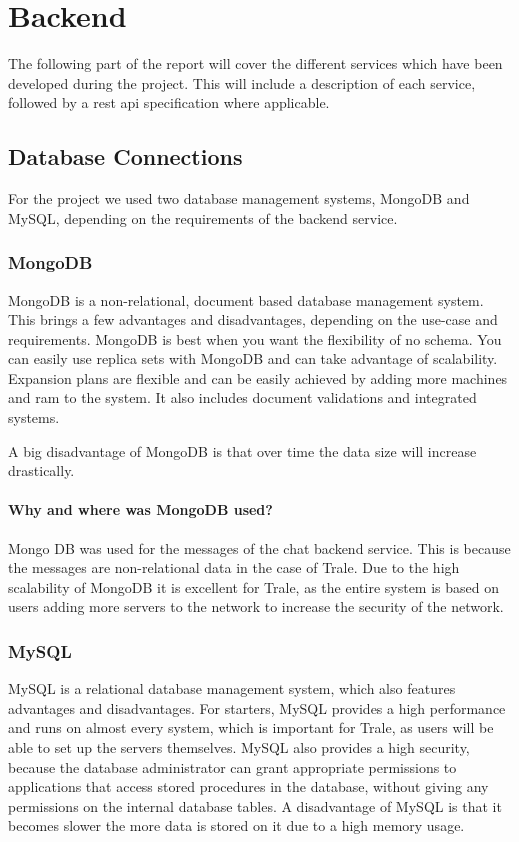 \section{Backend}\label{sec:backend}

The following part of the report will cover the different services which have been developed during the project.
This will include a description of each service, followed by a \ac{rest} \ac{api} specification where applicable.

\subsection{Database Connections}\label{subsec:database-connections}

For the project we used two database management systems, MongoDB and MySQL, depending on the requirements of the backend
service.

\subsubsection{MongoDB}
MongoDB is a non-relational, document based database management system.
This brings a few advantages and disadvantages, depending on the use-case and requirements.
MongoDB is best when you want the flexibility of no schema.
You can easily use replica sets with MongoDB and can take advantage of scalability.
Expansion plans are flexible and can be easily achieved by adding more machines and \ac{ram} to the system.
It also includes document validations and integrated systems.

A big disadvantage of MongoDB is that over time the data size will increase drastically.

\paragraph{Why and where was MongoDB used?}
Mongo DB was used for the messages of the chat backend service.
This is because the messages are non-relational data in the case of Trale.
Due to the high scalability of MongoDB it is excellent for Trale, as the entire system is based on users adding
more servers to the network to increase the security of the network.

\subsubsection{MySQL}
MySQL is a relational database management system, which also features advantages and disadvantages.
For starters, MySQL provides a high performance and runs on almost every system, which is important for Trale, as
users will be able to set up the servers themselves.
MySQL also provides a high security, because the database administrator can grant appropriate permissions to
applications that access stored procedures in the database, without giving any permissions on the internal database
tables.
A disadvantage of MySQL is that it becomes slower the more data is stored on it due to a high memory usage.

